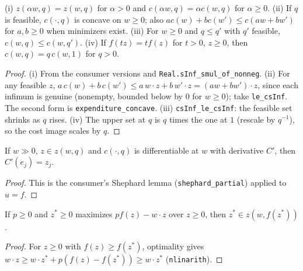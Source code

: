 \begin{proposition}
\label{prop:cost-props}
\leanok
{}
(i) $z(\alpha w, q) = z(w,q)$ for $\alpha > 0$ and $c(\alpha w, q) = \alpha c(w,q)$ for $\alpha \ge 0$.
(ii) If $q$ is feasible, $c(\cdot,q)$ is concave on $w \ge 0$; also $a c(w) + b c(w') \le c(aw + bw')$
for $a,b\ge0$ when minimizers exist. (iii) For $w \ge 0$ and $q \le q'$ with $q'$ feasible,
$c(w,q) \le c(w,q')$. (iv) If $f(tz) = t f(z)$ for $t > 0$, $z \ge 0$, then $c(w,q) = q\, c(w,1)$ for $q>0$.
\end{proposition}
\begin{proof}
\leanok
(i) From the consumer versions and \texttt{Real.sInf\_smul\_of\_nonneg}. (ii) For any feasible $z$,
$a\, c(w) + b\, c(w') \le a\, w\cdot z + b\, w'\cdot z = (aw+bw')\cdot z$, since each infimum is
genuine (nonempty, bounded below by $0$ for $w\ge0$); take \texttt{le\_csInf}. The second form is
\texttt{expenditure\_concave}. (iii) \texttt{csInf\_le\_csInf}: the feasible set shrinks as $q$ rises.
(iv) The upper set at $q$ is $q$ times the one at $1$ (rescale by $q^{-1}$), so the cost image
scales by $q$.
\end{proof}

\begin{theorem}
\label{thm:shephard-cost}
\leanok
{}
If $w \gg 0$, $z \in z(w,q)$ and $c(\cdot,q)$ is differentiable at $w$ with derivative $C'$, then
$C'(e_j) = z_j$.
\end{theorem}
\begin{proof}
\leanok
This is the consumer's Shephard lemma (\texttt{shephard\_partial}) applied to $u = f$.
\end{proof}

\begin{proposition}
\label{prop:profitmax-costmin}
\leanok
{}
If $p \ge 0$ and $z^* \ge 0$ maximizes $p f(z) - w\cdot z$ over $z \ge 0$, then $z^* \in z(w, f(z^*))$.
\end{proposition}
\begin{proof}
\leanok
For $z \ge 0$ with $f(z) \ge f(z^*)$, optimality gives
$w\cdot z \ge w\cdot z^* + p(f(z) - f(z^*)) \ge w\cdot z^*$ (\texttt{nlinarith}).
\end{proof}

